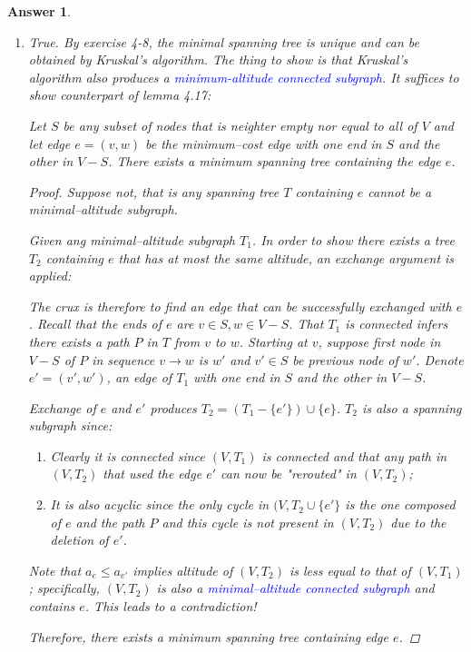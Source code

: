 \documentclass[11pt]{article}
\theoremstyle{numberplain}
\theoremstyle{nonumberplain}
\newtheorem{proof}{Proof}
\newtheorem{ans}{Answer}
\newcommand{\0}{{\mathbf{0}}}
\begin{document}
\begin{ans}
\begin{enumerate}
\item True. By exercise 4-8, the minimal spanning tree is unique and can be obtained by Kruskal's algorithm. The thing to show is that Kruskal's algorithm also produces a \textcolor{blue}{minimum-altitude connected subgraph}. It suffices to show counterpart of lemma 4.17:
\begin{lem}[4.17'] Let $S$ be any subset of nodes that is neighter empty nor equal to all of $V$ and let edge $e=(v,w)$ be the minimum--cost edge with one end in $S$ and the other in $V-S$. There exists a minimum spanning tree containing the edge $e$.
\end{lem}
\begin{proof} Suppose not, that is any spanning tree $T$ containing $e$ cannot be a minimal--altitude subgraph.\par 
Given ang minimal--altitude subgraph $T_1$. In order to show there exists a tree $T_2$ containing $e$ that has at most the same altitude, an exchange argument is applied:\par 
The crux is therefore to find an edge that can be successfully exchanged with $e$. Recall that the ends of $e$ are $v\in S,w\in V-S$. That $T_1$ is connected infers there exists a path $P$ in $T$ from $v$ to $w$. Starting at $v$, suppose first node in $V-S$ of $P$ in sequence $v\rightarrow w$ is $w'$ and $v'\in S$ be previous node of $w'$. Denote $e'=(v',w')$, an edge of $T_1$ with one end in $S$ and the other in $V-S$. \par 
Exchange of $e$ and $e'$ produces $T_2=(T_1-\{e'\})\cup \{e\}$. $T_2$ is also a spanning subgraph since:
\begin{enumerate}
\item Clearly it is connected since $(V,T_1)$ is connected and that any path in $(V,T_2)$ that used the edge $e'$ can now be "rerouted" in $(V,T_2)$;
\item It is also acyclic since the only cycle in $(V, T_2\cup\{e'\}$ is the one composed of $e$ and the path $P$ and this cycle is not present in $(V,T_2)$ due to the deletion of $e'$.
\end{enumerate}
Note that $a_e\leq a_{e'}$ implies altitude of $(V,T_2)$ is less equal to that of $(V,T_1)$; specifically, $(V,T_2)$ is also a \textcolor{blue}{minimal--altitude connected subgraph} and contains $e$. This leads to a contradiction!\par
Therefore, there exists a minimum spanning tree containing edge $e$.

\end{proof}
\end{enumerate}
\end{ans}
\end{document}
